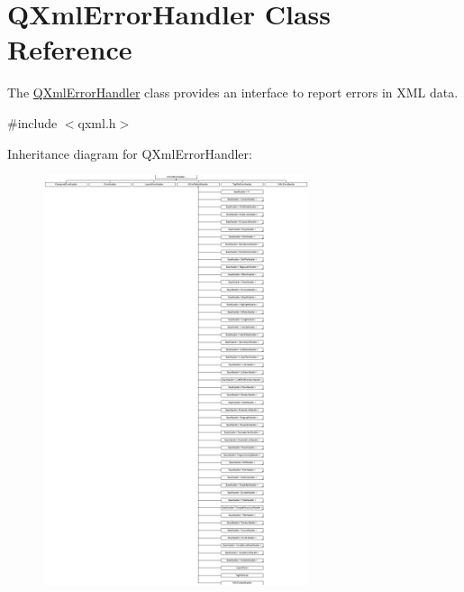 \hypertarget{class_q_xml_error_handler}{}\section{Q\+Xml\+Error\+Handler Class Reference}
\label{class_q_xml_error_handler}


The \mbox{\hyperlink{class_q_xml_error_handler}{Q\+Xml\+Error\+Handler}} class provides an interface to report errors in X\+ML data.  




{\ttfamily \#include $<$qxml.\+h$>$}

Inheritance diagram for Q\+Xml\+Error\+Handler\+:\begin{figure}[H]
\begin{center}
\leavevmode
\includegraphics[height=12.000000cm]{class_q_xml_error_handler}
\end{center}
\end{figure}
